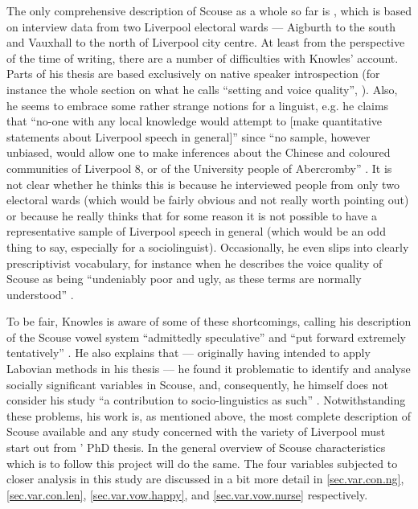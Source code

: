 The only comprehensive description of Scouse as a whole so far is \citet{knowles1973}, which is based on interview data from two Liverpool electoral wards --- Aigburth to the south and Vauxhall to the north of Liverpool city centre.
At least from the perspective of the time of writing, there are a number of difficulties with Knowles' account.
Parts of his thesis are based exclusively on native speaker introspection (for instance the whole section on what he calls ``setting and voice quality'', \citealt[cf.][102]{knowles1973}).
Also, he seems to embrace some rather strange notions for a linguist, e.g. he claims that ``no-one with any local knowledge would attempt to [make quantitative statements about Liverpool speech in general]'' since ``no sample, however unbiased, would allow one to make inferences about the Chinese and coloured communities of Liverpool 8, or of the University people of Abercromby'' \citep[3]{knowles1973}.
It is not clear whether he thinks this is because he interviewed people from only two electoral wards (which would be fairly obvious and not really worth pointing out) or because he really thinks that for some reason it is not possible to have a representative sample of Liverpool speech in general (which would be an odd thing to say, especially for a sociolinguist).
Occasionally, he even slips into clearly prescriptivist vocabulary, for instance when he describes the voice quality of Scouse as being ``undeniably poor and ugly, as these terms are normally understood'' \citep[116]{knowles1973}.

To be fair, Knowles is aware of some of these shortcomings, calling his description of the Scouse vowel system ``admittedly speculative'' and ``put forward extremely tentatively'' \citep[111]{knowles1973}.
He also explains that --- originally having intended to apply Labovian methods in his thesis --- he found it problematic to identify and analyse socially significant variables in Scouse, and, consequently, he himself does not consider his study ``a contribution to socio-linguistics as such'' \citep[cf.][1]{knowles1973}.
Notwithstanding these problems, his work is, as mentioned above, the most complete description of Scouse available and any study concerned with the variety of Liverpool must start out from \citeauthor{knowles1973}' PhD thesis.
In the general overview of Scouse characteristics which is to follow this project will do the same.
The four variables subjected to closer analysis in this study are discussed in a bit more detail in \ref{sec.var.con.ng}, \ref{sec.var.con.len}, \ref{sec.var.vow.happy}, and \ref{sec.var.vow.nurse} respectively.

